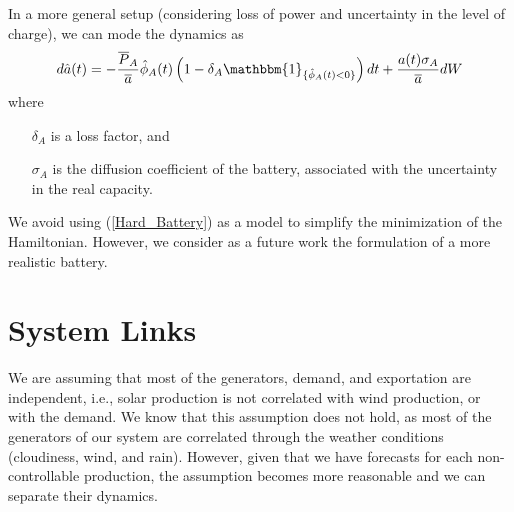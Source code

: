 In a more general setup (considering loss of power and uncertainty in the level of charge), we can mode the dynamics as
\begin{equation}
d\hat{a}(t)=-\frac{\overline{P}_A}{\overline{a}}\hat{\phi}_A(t)\left(1-\delta_A\mathbbm{1}_{\{\hat{\phi}_A(t)<0\}}\right)dt+\frac{a(t)\sigma_A}{\overline{a}}dW
\label{Hard_Battery}
\end{equation}
where
\begin{enumerate}

\item[$\delta_A$] is a loss factor, and

\item[$\sigma_A$] is the diffusion coefficient of the battery, associated with the uncertainty in the real capacity.

\end{enumerate}
We avoid using (\ref{Hard_Battery}) as a model to simplify the minimization of the Hamiltonian. However, we consider as a future work the formulation of a more realistic battery.

%

\section{System Links}

We are assuming that most of the generators, demand, and exportation are independent, i.e., solar production is not correlated with wind production, or with the demand. We know that this assumption does not hold, as most of the generators of our system are correlated through the weather conditions (cloudiness, wind, and rain). However, given that we have forecasts for each non-controllable production, the assumption becomes more reasonable and we can separate their dynamics.

